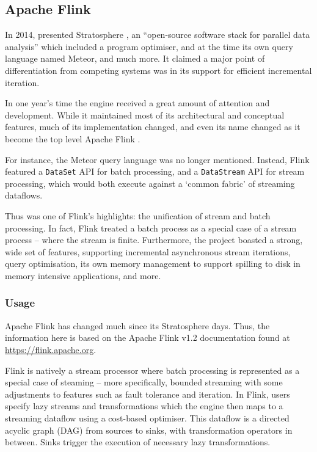 \subsection{Apache Flink}

  In 2014, \citeauthor{ALEXANDROV:STRATOSPHERE:2014} presented Stratosphere \cite{ALEXANDROV:STRATOSPHERE:2014}, an ``open-source software stack for parallel data analysis'' which included a program optimiser, and at the time its own query language named Meteor, and much more. It claimed a major point of differentiation from competing systems was in its support for efficient incremental iteration. 

  In one year's time the engine received a great amount of attention and development. While it maintained most of its architectural and conceptual features, much of its implementation changed, and even its name changed as it become the top level Apache Flink \cite{CarboneKEMHT:DEBU2015}.

  For instance, the Meteor query language was no longer mentioned. Instead, Flink featured a \texttt{DataSet} API for batch processing, and a \texttt{DataStream} API for stream processing, which would both execute against a `common fabric' of streaming dataflows.

  Thus was one of Flink's highlights: the unification of stream and batch processing. In fact, Flink treated a batch process as a special case of a stream process -- where the stream is finite. Furthermore, the project boasted a strong, wide set of features, supporting incremental asynchronous stream iterations, query optimisation, its own memory management to support spilling to disk in memory intensive applications, and more.


\subsubsection{Usage}
  
  Apache Flink has changed much since its Stratosphere days. Thus, the information here is based on the Apache Flink v1.2 documentation found at \url{https://flink.apache.org}.
  
  Flink is natively a stream processor where batch processing is represented as a special case of steaming -- more specifically, bounded streaming with some adjustments to features such as fault tolerance and iteration. In Flink, users specify lazy streams and transformations which the engine then maps to a streaming dataflow using a cost-based optimiser. This dataflow is a directed acyclic graph (DAG) from sources to sinks, with transformation operators in between. Sinks trigger the execution of necessary lazy transformations.

